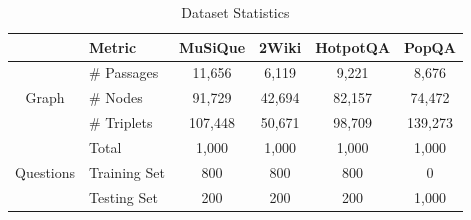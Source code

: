 \begin{table}[htbp]
 \setlength{\tabcolsep}{2pt}
\centering
\caption{Dataset Statistics}
\vspace{-0.4cm}
\begin{tabular}{clcccc}
\toprule
    & Metric & MuSiQue & 2Wiki & HotpotQA & PopQA \\
\midrule
\multirow{3}{*}{Graph} &\# Passages & 11,656  & 6,119  & 9,221   & 8,676 \\
&\# Nodes & 91,729 & 42,694 &  82,157  & 74,472 \\
&\# Triplets & 107,448 & 50,671 &  98,709 & 139,273 \\
\midrule
\multirow{3}{*}{Questions} & Total & 1,000  & 1,000  & 1,000   & 1,000 \\
&Training Set & 800 & 800 &  800  & 0 \\
&Testing Set  & 200 & 200 &  200 & 1,000 \\
\bottomrule
\end{tabular}
\label{tab:qa_datasets_stats}
\end{table}
